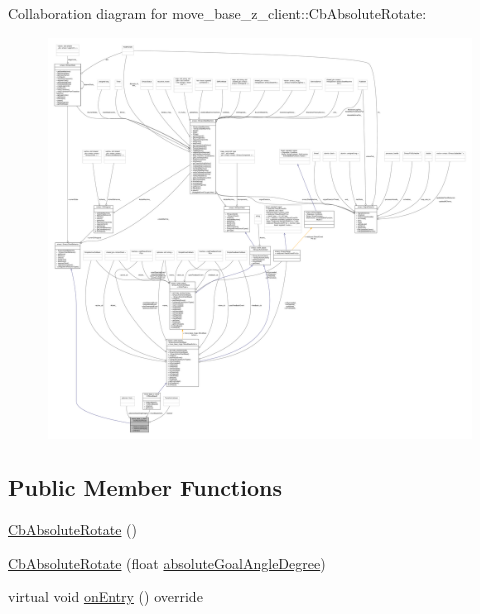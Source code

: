 Collaboration diagram for move\+\_\+base\+\_\+z\+\_\+client\+:\+:Cb\+Absolute\+Rotate\+:\nopagebreak
\begin{figure}[H]
\begin{center}
\leavevmode
\includegraphics[width=350pt]{classmove__base__z__client_1_1CbAbsoluteRotate__coll__graph}
\end{center}
\end{figure}
\subsection*{Public Member Functions}
\begin{DoxyCompactItemize}
\item 
\hyperlink{classmove__base__z__client_1_1CbAbsoluteRotate_a9af55c847c2ad3f797c873eb394ed1e8}{Cb\+Absolute\+Rotate} ()
\item 
\hyperlink{classmove__base__z__client_1_1CbAbsoluteRotate_a249eeb852daaba2fef543737b64f0648}{Cb\+Absolute\+Rotate} (float \hyperlink{classmove__base__z__client_1_1CbAbsoluteRotate_a3732ce20b520f9df9408f849ff809a19}{absolute\+Goal\+Angle\+Degree})
\item 
virtual void \hyperlink{classmove__base__z__client_1_1CbAbsoluteRotate_ab5537a52d9ddb242be60e6f9e0b231af}{on\+Entry} () override
\end{DoxyCompactItemize}

